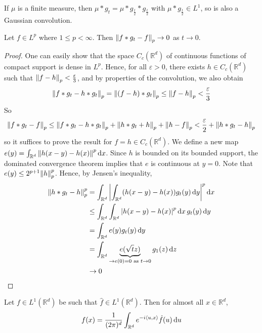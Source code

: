 \begin{remark}
	If \( \mu \) is a finite measure, then \( \mu \ast g_t = \mu \ast g_{\frac{t}{2}} \ast g_{\frac{t}{2}} \) with \( \mu \ast g_{\frac{t}{2}} \in L^1 \), so is also a Gaussian convolution.
\end{remark}
\begin{lemma}
	Let \( f \in L^p \) where \( 1 \leq p < \infty \).
	Then \( \norm{f \ast g_t - f}_p \to 0 \) as \( t \to 0 \).
\end{lemma}
\begin{proof}
	One can easily show that the space \( C_c(\mathbb R^d) \) of continuous functions of compact support is dense in \( L^p \).
	Hence, for all \( \varepsilon > 0 \), there exists \( h \in C_c(\mathbb R^d) \) such that \( \norm{f - h}_p < \frac{\varepsilon}{3} \), and by properties of the convolution, we also obtain
	\[ \norm{f \ast g_t - h \ast g_t}_p = \norm{(f - h) \ast g_t}_p \leq \norm{f - h}_p < \frac{\varepsilon}{3} \]
	So
	\[ \norm{f \ast g_t - f}_p \leq \norm{f \ast g_t - h \ast g_t}_p + \norm{h \ast g_t + h}_p + \norm{h - f}_p < \frac{\varepsilon}{2} + \norm{h \ast g_t - h}_p \]
	so it suffices to prove the result for \( f = h \in C_c(\mathbb R^d) \).
	We define a new map \( e(y) = \int_{\mathbb R^d} \norm{h(x-y) - h(x)}^p \dd{x} \).
	Since \( h \) is bounded on its bounded support, the dominated convergence theorem implies that \( e \) is continuous at \( y = 0 \).
	Note that \( e(y) \leq 2^{p+1} \norm{h}_p^p \).
	Hence, by Jensen's inequality,
	\begin{align*}
		\norm{h \ast g_t - h}_p^p &= \int_{\mathbb R^d} \abs{ \int_{\mathbb R^d} (h(x-y) - h(x)) g_t(y) \dd{y} }^p \dd{x} \\
		&\leq \int_{\mathbb R^d} \int_{\mathbb R^d} \abs{h(x-y) - h(x)}^p \dd{x} g_t(y) \dd{y} \\
		&= \int_{\mathbb R^d} e(y) g_t(y) \dd{y} \\
		&= \int_{\mathbb R^d} \underbrace{e(\sqrt{t} z)}_{\to e(0) = 0 \text{ as } t \to 0} g_1(z) \dd{z} \\
		&\to 0
	\end{align*}
\end{proof}
\begin{theorem}
	Let \( f \in L^1(\mathbb R^d) \) be such that \( \hat f \in L^1(\mathbb R^d) \).
	Then for almost all \( x \in \mathbb R^d \),
	\[ f(x) = \frac{1}{(2\pi)^d} \int_{\mathbb R^d} e^{-i\left\langle{u,x}\right\rangle} \hat f(u) \dd{u} \]
\end{theorem}
